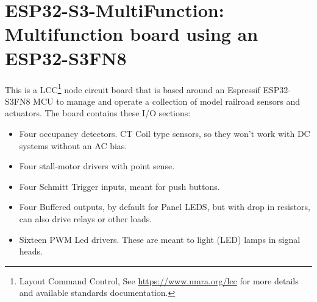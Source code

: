 %
%
%
%
% 
%
%
%
%
%
% 
%

\chapter{ESP32-S3-MultiFunction: Multifunction board using an ESP32-S3FN8}

This is a LCC\footnote{Layout Command Control, See
\url{https://www.nmra.org/lcc} for more details and available standards
documentation.} node circuit board that is based around an Espressif
ESP32-S3FN8 MCU to manage and operate a collection of model railroad sensors
and actuators. The board contains these I/O sections:

\begin{itemize}
\item Four occupancy detectors. CT Coil type sensors, so they won't work with
DC systems without an AC bias. 
\item Four stall-motor drivers with point sense. 
\item Four Schmitt Trigger inputs, meant for push buttons. 
\item Four Buffered outputs, by default for Panel LEDS, but with drop in
resistors, can also drive relays or other loads. 
\item Sixteen PWM Led drivers. These are meant to light (LED) lamps in signal
heads.
\end{itemize}

